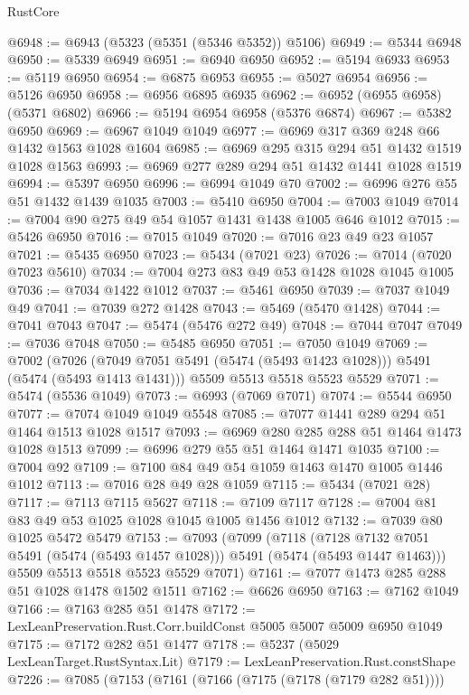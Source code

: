 \begin{lexlean}{RustCore}
\begin{coremodule}
@6948 := @6943 (@5323 (@5351 (@5346 @5352)) @5106)
@6949 := @5344 @6948
@6950 := @5339 @6949
@6951 := @6940 @6950
@6952 := @5194 @6933
@6953 := @5119 @6950
@6954 := @6875 @6953
@6955 := @5027 @6954
@6956 := @5126 @6950
@6958 := @6956 @6895 @6935
@6962 := @6952 (@6955 @6958) (@5371 @6802)
@6966 := @5194 @6954 @6958 (@5376 @6874)
@6967 := @5382 @6950
@6969 := @6967 @1049 @1049
@6977 := @6969 @317 @369 @248 @66 @1432 @1563 @1028 @1604
@6985 := @6969 @295 @315 @294 @51 @1432 @1519 @1028 @1563
@6993 := @6969 @277 @289 @294 @51 @1432 @1441 @1028 @1519
@6994 := @5397 @6950
@6996 := @6994 @1049 @70
@7002 := @6996 @276 @55 @51 @1432 @1439 @1035
@7003 := @5410 @6950
@7004 := @7003 @1049
@7014 := @7004 @90 @275 @49 @54 @1057 @1431 @1438 @1005 @646 @1012
@7015 := @5426 @6950
@7016 := @7015 @1049
@7020 := @7016 @23 @49 @23 @1057
@7021 := @5435 @6950
@7023 := @5434 (@7021 @23)
@7026 := @7014 (@7020 @7023 @5610)
@7034 := @7004 @273 @83 @49 @53 @1428 @1028 @1045 @1005
@7036 := @7034 @1422 @1012
@7037 := @5461 @6950
@7039 := @7037 @1049 @49
@7041 := @7039 @272 @1428
@7043 := @5469 (@5470 @1428)
@7044 := @7041 @7043
@7047 := @5474 (@5476 @272 @49)
@7048 := @7044 @7047
@7049 := @7036 @7048
@7050 := @5485 @6950
@7051 := @7050 @1049
@7069 := @7002
    (@7026 (@7049 @7051 @5491 (@5474 (@5493 @1423 @1028))) @5491 (@5474 (@5493 @1413 @1431)))
    @5509
    @5513
    @5518
    @5523
    @5529
@7071 := @5474 (@5536 @1049)
@7073 := @6993 (@7069 @7071)
@7074 := @5544 @6950
@7077 := @7074 @1049 @1049 @5548
@7085 := @7077 @1441 @289 @294 @51 @1464 @1513 @1028 @1517
@7093 := @6969 @280 @285 @288 @51 @1464 @1473 @1028 @1513
@7099 := @6996 @279 @55 @51 @1464 @1471 @1035
@7100 := @7004 @92
@7109 := @7100 @84 @49 @54 @1059 @1463 @1470 @1005 @1446 @1012
@7113 := @7016 @28 @49 @28 @1059
@7115 := @5434 (@7021 @28)
@7117 := @7113 @7115 @5627
@7118 := @7109 @7117
@7128 := @7004 @81 @83 @49 @53 @1025 @1028 @1045 @1005 @1456 @1012
@7132 := @7039 @80 @1025 @5472 @5479
@7153 := @7093
    (@7099
      (@7118
        (@7128 @7132 @7051 @5491 (@5474 (@5493 @1457 @1028)))
        @5491
        (@5474 (@5493 @1447 @1463)))
      @5509
      @5513
      @5518
      @5523
      @5529
      @7071)
@7161 := @7077 @1473 @285 @288 @51 @1028 @1478 @1502 @1511
@7162 := @6626 @6950
@7163 := @7162 @1049
@7166 := @7163 @285 @51 @1478
@7172 := LexLeanPreservation.Rust.Corr.buildConst @5005 @5007 @5009 @6950 @1049
@7175 := @7172 @282 @51 @1477
@7178 := @5237 (@5029 LexLeanTarget.RustSyntax.Lit)
@7179 := LexLeanPreservation.Rust.constShape
@7226 := @7085
    (@7153
      (@7161
        (@7166 (@7175 (@7178 (@7179 @282 @51))))

\end{coremodule}
\end{lexlean}
